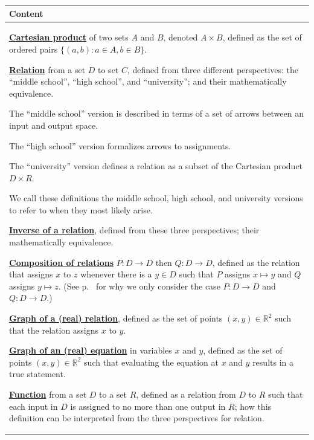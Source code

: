 \documentclass[11pt]{article}
\newcommand{\R}{\mathbb{R}}
\newcommand\st{:}
\renewcommand\emph[1]{\underline{\bf{#1}}} %
\theoremstyle{definition}
\begin{document}
\begin{tabular}{L{6.5in}} 
{\bf Content} \\ \hline \parskip4pt
\emph{Cartesian product} of two sets $A$ and $B$, denoted $A\times B$, defined as the set of ordered pairs $\{ (a,b) \st a\in A, b\in B \}$.

\emph{Relation} from a set $D$ to set $C$, defined from three different perspectives: the ``middle school'', ``high school'', and ``university''; and their mathematically equivalence. 
\begin{itemize*}
\item The ``middle school'' version is described in terms of a set of arrows between an input and output space.
\item The ``high school'' version formalizes arrows to assignments. 
\item The ``university'' version defines a relation as a subset of the Cartesian product $D\times R$. 
\end{itemize*}
We call these definitions the middle school, high school, and university versions to refer to when they most likely arise. 

\emph{Inverse of a relation}, defined from these three perspectives; their mathematically equivalence.

\emph{Composition of relations} $P:D\to D$ then $Q:D\to D$, defined 
as the relation that assigns $x$ to $z$ whenever there is a $y\in D$ such that $P$ assigns $x\mapsto y$ and $Q$ assigns $y\mapsto z$. (See p.~\pageref{s: composition} for why we only consider the case $P:D\to D$ and $Q:D\to D$.)

\emph{Graph of a (real) relation}, defined as the set of points $(x,y)\in \R^2$ such that the relation assigns $x$ to $y$.

\emph{Graph of an (real) equation} in variables $x$ and $y$, defined as the set of points $(x,y)\in \R^2$ such that evaluating the equation at $x$ and $y$ results in a true statement.

\emph{Function} from a set $D$ to a set $R$, defined as a relation from $D$ to $R$ such that each input in $D$ is assigned to no more than one output in $R$; how this definition can be interpreted from the three perspectives for relation.
\end{tabular} 
\end{document}

